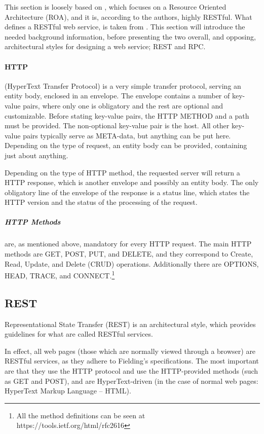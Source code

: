 This section is loosely based on \citet{restful_web_services}, which focuses on a Resource Oriented Architecture (ROA), and it is, according to the authors, highly RESTful.
What defines a RESTful web service, is taken from \citet{fielding_dissertation}.
This section will introduce the needed background information, before presenting the two overall, and opposing, architectural styles for designing a web service; REST and RPC.

\paragraph{HTTP} (HyperText Transfer Protocol) is a very simple transfer protocol, serving an entity body, enclosed in an envelope.
The envelope contains a number of key-value pairs, where only one is obligatory and the rest are optional and customizable.
Before stating key-value pairs, the HTTP METHOD and a path must be provided.
The non-optional key-value pair is the host.
All other key-value pairs typically serve as META-data, but anything can be put here.
Depending on the type of request, an entity body can be provided, containing just about anything.

Depending on the type of HTTP method, the requested server will return a HTTP response, which is another envelope and possibly an entity body.
The only obligatory line of the envelope of the response is a status line, which states the HTTP version and the status of the processing of the request.

\subparagraph{HTTP Methods} are, as mentioned above, mandatory for every HTTP request.
The main HTTP methods are GET, POST, PUT, and DELETE, and they correspond to Create, Read, Update, and Delete (CRUD) operations.
Additionally there are OPTIONS, HEAD, TRACE, and CONNECT.\footnote{All the method definitions can be seen at https://tools.ietf.org/html/rfc2616}

\subsection{REST}
Representational State Transfer (REST) is an architectural style, which provides guidelines for what are called RESTful services.

In effect, all web pages (those which are normally viewed through a browser) are RESTful services, as they adhere to Fielding's specifications.
The most important are that they use the HTTP protocol and use the HTTP-provided methods (such as GET and POST), and are HyperText-driven (in the case of normal web pages: HyperText Markup Language -- HTML).

